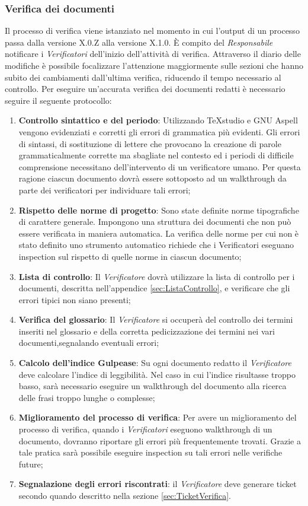 {	\subsubsection{Verifica dei documenti}
	Il processo di verifica viene istanziato nel momento in cui l’output di un processo passa dalla versione X.0.Z alla versione X.1.0. È compito del \emph{Responsabile} notificare i \emph{Verificatori} dell'inizio dell'attività di verifica. Attraverso il diario delle modifiche è possibile focalizzare l'attenzione maggiormente sulle sezioni che hanno subito dei cambiamenti dall'ultima verifica, riducendo il tempo necessario al controllo.
	Per eseguire un'accurata verifica dei documenti redatti è necessario seguire il seguente protocollo:
	\begin{enumerate}
	\item \textbf{Controllo sintattico e del periodo}: Utilizzando TeXstudio e GNU Aspell vengono evidenziati e corretti gli errori di grammatica più evidenti. Gli errori di sintassi, di sostituzione di lettere che provocano la creazione di parole grammaticalmente corrette ma sbagliate nel contesto ed i periodi di difficile comprensione necessitano dell’intervento di un verificatore umano. Per questa ragione ciascun documento dovrà essere sottoposto ad un walkthrough da parte dei verificatori per individuare tali errori;
	\item \textbf{Rispetto delle norme di progetto}: Sono state definite norme tipografiche di carattere generale. Impongono una struttura dei documenti che non può essere verificata in maniera automatica. La verifica delle norme
	per cui non è stato definito uno strumento automatico richiede che i Verificatori eseguano inspection sul rispetto di quelle norme in ciascun documento;
	\item \textbf{Lista di controllo}: Il \emph{Verificatore} dovrà utilizzare la lista di controllo per i
	documenti, descritta nell’appendice \ref{sec:ListaControllo}, e verificare che gli errori tipici non siano	presenti;
	\item \textbf{Verifica del glossario}: Il \emph{Verificatore} si occuperà del controllo dei termini inseriti nel glossario e della corretta pedicizzazione dei termini nei vari documenti,segnalando eventuali errori;
	\item \textbf{Calcolo dell’indice Gulpease}: Su ogni documento redatto il \emph{Verificatore} deve calcolare l’indice di leggibilità. Nel caso in cui l’indice risultasse troppo basso, sarà necessario eseguire un walkthrough del documento alla ricerca delle frasi troppo lunghe o complesse;
	\item \textbf{Miglioramento del processo di verifica}: Per avere un miglioramento del processo di verifica, quando i \emph{Verificatori} eseguono walkthrough di un documento, dovranno riportare gli errori più frequentemente trovati. Grazie a tale pratica sarà possibile eseguire inspection su tali errori nelle verifiche future;
	\item \textbf{Segnalazione degli errori riscontrati}: il \emph{Verificatore} deve generare ticket secondo quando descritto nella
	sezione \ref{sec:TicketVerifica}.
	\end{enumerate}
}

